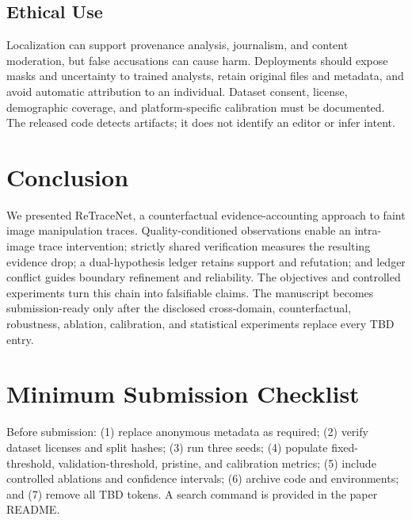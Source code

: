 \documentclass[journal]{IEEEtran}
\newcommand{\TBD}{\textcolor{red!70!black}{TBD}}
\newcommand{\method}{ReTraceNet}
\begin{document}
\subsection{Ethical Use}
Localization can support provenance analysis, journalism, and content moderation,
but false accusations can cause harm.  Deployments should expose masks and
uncertainty to trained analysts, retain original files and metadata, and avoid
automatic attribution to an individual.  Dataset consent, license, demographic
coverage, and platform-specific calibration must be documented.  The released
code detects artifacts; it does not identify an editor or infer intent.

\section{Conclusion}
We presented \method, a counterfactual evidence-accounting approach to faint image
manipulation traces. Quality-conditioned observations enable an intra-image trace
intervention; strictly shared verification measures the resulting evidence drop;
a dual-hypothesis ledger retains support and refutation; and ledger conflict guides
boundary refinement and reliability. The objectives and controlled experiments
turn this chain into falsifiable claims. The manuscript becomes submission-ready
only after the disclosed cross-domain, counterfactual, robustness, ablation,
calibration, and statistical experiments replace every \TBD{} entry.




\appendices
\section{Minimum Submission Checklist}
Before submission: (1) replace anonymous metadata as required; (2) verify dataset
licenses and split hashes; (3) run three seeds; (4) populate fixed-threshold,
validation-threshold, pristine, and calibration metrics; (5) include controlled
ablations and confidence intervals; (6) archive code and environments; and (7)
remove all \TBD{} tokens.  A search command is provided in the paper README.
\end{document}
